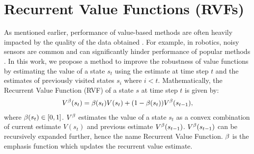\section{Recurrent Value Functions (RVFs)}
\label{RLRL}
As mentioned earlier, performance of value-based methods are often heavily impacted by the quality of the data obtained \cite{fox2015taming,pendrith1994reinforcement}. For example, in robotics, noisy sensors are common and can significantly hinder performance of popular methods \cite{romoff2018reward}. In this work, we propose a method to improve the robustness of value functions by estimating the value of a state $s_t$ using the estimate at time step $t$ and the estimates of previously visited states $s_i$ where $i < t$.
Mathematically, the Recurrent Value Function (RVF) of a state $s$ at time step $t$ is given by:
\begin{equation}
\label{value}
\begin{split}
    V^{\beta}(s_t) &= \beta(s_t) V(s_t) + (1 - \beta(s_t)) V^{\beta}(s_{t-1}), \\ 
\end{split}
\end{equation}
where  $\beta(s_t) \in [0,1]$. $V^{\beta}$ estimates the value of a state $s_t$ as a convex combination of current estimate $V(s_t)$ and previous estimate $V^{\beta}(s_{t-1})$. $V^{\beta}(s_{t-1})$ can be recursively expanded further, hence the name Recurrent Value Function. $\beta$ is the emphasis function which updates the recurrent value estimate. 

